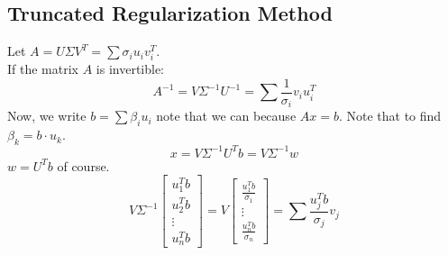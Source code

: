 \subsection{Truncated Regularization Method}
Let $A=U\Sigma V^T = \sum \sigma_i u_i v_i^T$.\\
If the matrix $A$ is invertible: $$A^{-1}= V\Sigma^{-1}U^{-1} =\sum \frac{1}{\sigma_i} v_i u_i^T$$
Now, we write $b=\sum \beta_i u_i$ note that we can because $Ax=b$. Note that to find $\beta_k=b\cdot u_k$.
$$ x=V\Sigma^{-1} U^T b = V\Sigma^{-1} w$$
$w=U^T b$ of course.
\begin{equation*}
V\Sigma ^{-1} \begin{bmatrix} u_1^Tb \\ u_2^Tb \\ \vdots \\ u_n^Tb \end{bmatrix} = V \begin{bmatrix} \frac{u_1^Tb}{\sigma_1} \\  \vdots \\ \frac{u_n^Tb}{\sigma_n} \end{bmatrix} = \sum \frac{u_j^T b}{\sigma_j}v_j
\end{equation*}

